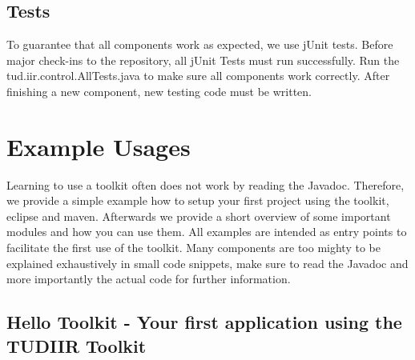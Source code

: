 \documentclass[a4paper,twoside]{article}      %
\begin{document}
\subsection{Tests}
To guarantee that all components work as expected, we use jUnit tests. Before major check-ins to the repository, all jUnit Tests must run successfully. Run the tud.iir.control.AllTests.java to make sure all components work correctly.
After finishing a new component, new testing code must be written.


\section{Example Usages}
Learning to use a toolkit often does not work by reading the Javadoc. Therefore, we provide a simple example how to setup your first project using the toolkit, eclipse and maven. Afterwards we provide a short overview of some important modules and how you can use them. All examples are intended as entry points to facilitate the first use of the toolkit. Many components are too mighty to be explained exhaustively in small code snippets, make sure to read the Javadoc and more importantly the actual code for further information.

\subsection{Hello Toolkit - Your first application using the TUDIIR Toolkit}
\end{document}
